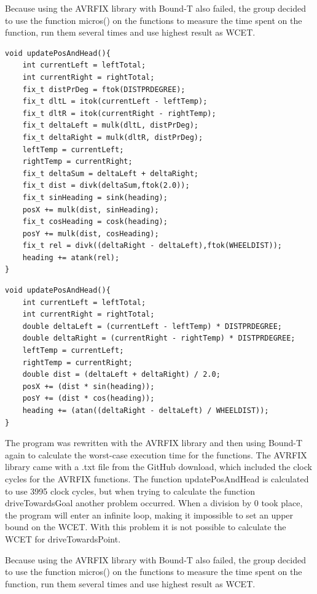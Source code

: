 Because using the AVRFIX library with Bound-T also failed, the group decided to use the function micros() on the functions to measure the time spent on the function, run them several times and use highest result as WCET.

\begin{lstlisting}[caption={The function updatePosAndHead with AWRFIX library}, label={Update1}]
void updatePosAndHead(){
	int currentLeft = leftTotal;
	int currentRight = rightTotal;
	fix_t distPrDeg = ftok(DISTPRDEGREE);
	fix_t dltL = itok(currentLeft - leftTemp);
	fix_t dltR = itok(currentRight - rightTemp);
	fix_t deltaLeft = mulk(dltL, distPrDeg);
	fix_t deltaRight = mulk(dltR, distPrDeg);
	leftTemp = currentLeft;
	rightTemp = currentRight;
	fix_t deltaSum = deltaLeft + deltaRight;
	fix_t dist = divk(deltaSum,ftok(2.0));
	fix_t sinHeading = sink(heading);
	posX += mulk(dist, sinHeading);
	fix_t cosHeading = cosk(heading);
	posY += mulk(dist, cosHeading);
	fix_t rel = divk((deltaRight - deltaLeft),ftok(WHEELDIST));
	heading += atank(rel);
}
\end{lstlisting}

\begin{lstlisting}[caption={The function updatePosAndHead from the Arduino IDE}, label={Update2}]
void updatePosAndHead(){
	int currentLeft = leftTotal;
	int currentRight = rightTotal;
	double deltaLeft = (currentLeft - leftTemp) * DISTPRDEGREE;
	double deltaRight = (currentRight - rightTemp) * DISTPRDEGREE;
	leftTemp = currentLeft;
	rightTemp = currentRight;
	double dist = (deltaLeft + deltaRight) / 2.0;
	posX += (dist * sin(heading));
	posY += (dist * cos(heading));
	heading += (atan((deltaRight - deltaLeft) / WHEELDIST));
}
\end{lstlisting}

The program was rewritten with the AVRFIX library and then using Bound-T again to calculate the worst-case execution time for the functions. The AVRFIX library came with a .txt file from the GitHub download, which included the clock cycles for the AVRFIX functions. \newline
The function updatePosAndHead is calculated to use 3995 clock cycles, but when trying to calculate the function driveTowardsGoal another problem occurred. When a division by 0 took place, the program will enter an infinite loop, making it impossible to set an upper bound on the WCET. With this problem it is not possible to calculate the WCET for driveTowardsPoint.

Because using the AVRFIX library with Bound-T also failed, the group decided to use the function micros() on the functions to measure the time spent on the function, run them several times and use highest result as WCET. 

